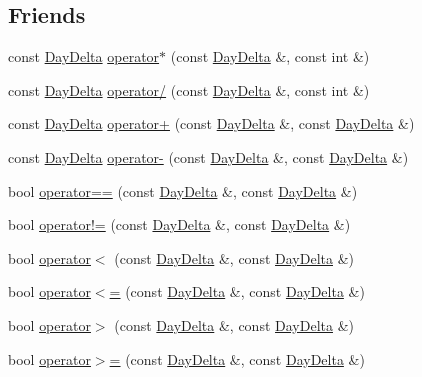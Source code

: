 \subsection*{\-Friends}
\begin{DoxyCompactItemize}
\item 
const \hyperlink{structDayDelta}{\-Day\-Delta} \hyperlink{structDayDelta_ad744ce917d84eeb36a714a0743082a9e}{operator$\ast$} (const \hyperlink{structDayDelta}{\-Day\-Delta} \&, const int \&)
\item 
const \hyperlink{structDayDelta}{\-Day\-Delta} \hyperlink{structDayDelta_a78fe4e3a74d889ef0743b4fd1aee1481}{operator/} (const \hyperlink{structDayDelta}{\-Day\-Delta} \&, const int \&)
\item 
const \hyperlink{structDayDelta}{\-Day\-Delta} \hyperlink{structDayDelta_a281859b3e03b46be983288815761aa6b}{operator+} (const \hyperlink{structDayDelta}{\-Day\-Delta} \&, const \hyperlink{structDayDelta}{\-Day\-Delta} \&)
\item 
const \hyperlink{structDayDelta}{\-Day\-Delta} \hyperlink{structDayDelta_a33ace0bde4e898436bfd1bb430e09ca3}{operator-\/} (const \hyperlink{structDayDelta}{\-Day\-Delta} \&, const \hyperlink{structDayDelta}{\-Day\-Delta} \&)
\item 
bool \hyperlink{structDayDelta_afd3daebb578fdeba71f41dca9e485a71}{operator==} (const \hyperlink{structDayDelta}{\-Day\-Delta} \&, const \hyperlink{structDayDelta}{\-Day\-Delta} \&)
\item 
bool \hyperlink{structDayDelta_a84010ae193d86bdbd3eff7a719c86204}{operator!=} (const \hyperlink{structDayDelta}{\-Day\-Delta} \&, const \hyperlink{structDayDelta}{\-Day\-Delta} \&)
\item 
bool \hyperlink{structDayDelta_aa93123e48cb4ba1c40133fbce862143e}{operator$<$} (const \hyperlink{structDayDelta}{\-Day\-Delta} \&, const \hyperlink{structDayDelta}{\-Day\-Delta} \&)
\item 
bool \hyperlink{structDayDelta_af89fa21d1b6be6acb7d5ff574640d8f1}{operator$<$=} (const \hyperlink{structDayDelta}{\-Day\-Delta} \&, const \hyperlink{structDayDelta}{\-Day\-Delta} \&)
\item 
bool \hyperlink{structDayDelta_a8ea55528acf383ece24abc904204cf28}{operator$>$} (const \hyperlink{structDayDelta}{\-Day\-Delta} \&, const \hyperlink{structDayDelta}{\-Day\-Delta} \&)
\item 
bool \hyperlink{structDayDelta_a84d75c6dd0271ab2443667bee622847c}{operator$>$=} (const \hyperlink{structDayDelta}{\-Day\-Delta} \&, const \hyperlink{structDayDelta}{\-Day\-Delta} \&)
\end{DoxyCompactItemize}


